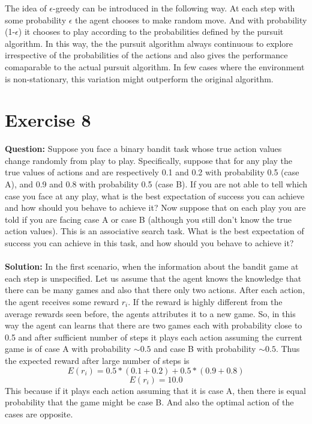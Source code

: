 \documentclass[a4paper,10pt]{report}
\begin{document}
The idea of $\epsilon$-greedy can be introduced in the following way.
At each step with some probability $\epsilon$ the agent chooses to make random move. And with probability (1-$\epsilon$) it chooses to play according to the probabilities defined by the pursuit algorithm. In this way, the the pursuit algorithm always continuous to explore irrespective of the probabilities of the actions and also gives the performance comaparable to the actual pursuit algorithm. In few cases where the environment is non-stationary, this variation might outperform the original algorithm.

\section{Exercise 8}
\textbf{Question:}
Suppose you face a binary bandit task whose true action values change randomly from play to play. Specifically, suppose that for any play the true values of actions  and  are respectively 0.1 and 0.2 with probability 0.5 (case A), and 0.9 and 0.8 with probability 0.5 (case B). If you are not able to tell which case you face at any play, what is the best expectation of success you can achieve and how should you behave to achieve it? Now suppose that on each play you are told if you are facing case A or case B (although you still don't know the true action values). This is an associative search task. What is the best expectation of success you can achieve in this task, and how should you behave to achieve it?
\\\\
\textbf{Solution:}
In the first scenario, when the information about the bandit game at each step is unspecified. Let us assume that the agent knows the knowledge that there can be many games and also that there only two actions. After each action, the agent receives some reward $r_i$. If the reward is highly different from the average rewards seen before, the agents attributes it to a new game. So, in this way the agent can learns that there are two games each with probability close to 0.5 and after sufficient number of steps it plays each action assuming the current game is of case A with probability $\sim0.5$ and case B with probability $\sim0.5$. Thus the expected reward after large number of steps is
\[E(r_i) = 0.5*(0.1+0.2) + 0.5*(0.9+0.8)\]
\[E(r_i) = 10.0 \]
This because if it plays each action assuming that it is case A, then there is equal probability that the game might be case B. And also the optimal action of the cases are opposite.
\end{document}
